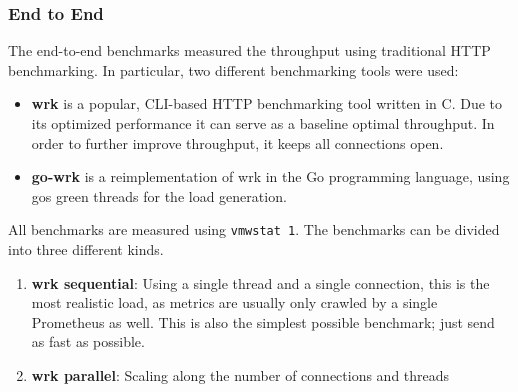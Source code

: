 \subsubsection{End to End}
The end-to-end benchmarks measured the throughput using traditional HTTP benchmarking. In particular, two different
benchmarking tools were used:
\begin{itemize}
  \item \textbf{wrk} \cite{wrk} is a popular, CLI-based HTTP benchmarking tool written in C. Due to its optimized
    performance it can serve as a baseline optimal throughput. In order to further improve throughput, it keeps
    all connections open.
  \item \textbf{go-wrk} \cite{go-wrk} is a reimplementation of wrk in the Go programming language, using gos
    green threads for the load generation.
\end{itemize}
All benchmarks are measured using \texttt{vmwstat 1}. The benchmarks can be divided into three different kinds.
\begin{enumerate}
  \item \textbf{wrk sequential}: Using a single thread and a single connection, this is the most realistic load,
    as metrics are usually only crawled by a single Prometheus as well. This is also the simplest possible benchmark;
    just send as fast as possible.
  \item \textbf{wrk parallel}: Scaling along the number of connections and threads
\end{enumerate}

